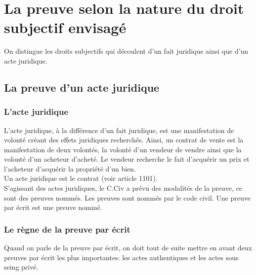\section{La preuve selon la nature du droit subjectif envisagé}

On distingue les droits subjectifs qui découlent d'un fait juridique ainsi que d'un acte juridique. 

\subsection{La preuve d'un acte juridique}

\subsubsection{L'acte juridique}

L'acte juridique, à la différence d'un fait juridique, est une manifestation de volonté créant des effets juridiques recherchés. Ainsi, un contrat de vente est la manifestation de deux volontés, la volonté d'un vendeur de vendre ainsi que la volonté d'un acheteur d'acheté. Le vendeur recherche le fait d'acquérir un prix et l'acheteur d'acquérir la propriété d'un bien. \\
Un acte juridique est le contrat (voir article 1101). \\
S'agissant des actes juridiques, le C.Civ a prévu des modalités de la preuve, ce sont des preuves nommés. Les preuves sont nommés par le code civil. Une preuve par écrit est une preuve nommé.

\subsubsection{Le règne de la preuve par écrit}

Quand on parle de la preuve par écrit, on doit tout de suite mettre en avant deux preuves par écrit les plus importantes: les actes authentiques et les actes sous seing privé.



